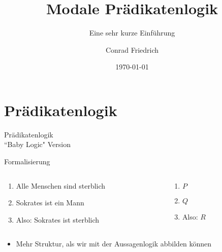 \documentclass[12pt]{beamer}
\title[Philosophische modale Prädikatenlogik]{Modale Prädikatenlogik}
\subtitle{Eine sehr kurze Einführung}
\author{Conrad Friedrich}
\institute[Uni Köln]{Universität zu Köln}
\date{\today}
\begin{document}
\begin{frame}
\titlepage
\end{frame}

\section{Prädikatenlogik}

\begin{frame}
  \Huge Prädikatenlogik \\
\pause
\large ``Baby Logic" Version
\end{frame}

\begin{frame}{Formalisierung}
  \begin{columns}

    \begin{column}[t]{5cm}
      \begin{enumerate}
      \item<1-> Alle Menschen sind sterblich \\
      \item<1-> Sokrates ist ein Mann\\
      \item<2-> Also: Sokrates ist sterblich
      \end{enumerate}
    \end{column}

    \begin{column}[t]{5cm}
      \begin{enumerate}
      \item<3-> $P$
      \item<3-> $Q$
      \item<3-> Also: $R$
      \end{enumerate}
    \end{column}

  \end{columns}

  \vspace{10 mm}
  \begin{itemize}
  \item<4-> Mehr Struktur, als wir mit der Aussagenlogik abbilden
    können
  \end{itemize}
\end{frame}
\end{document}
